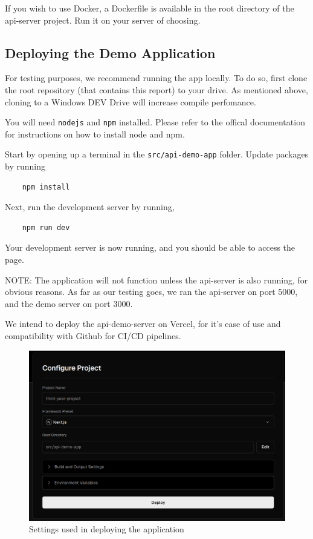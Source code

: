 If you wish to use Docker, a Dockerfile is available in the root directory of the api-server project. Run it on your server of choosing.

\subsection{Deploying the Demo Application}

For testing purposes, we recommend running the app locally. To do so, first clone the root repository (that contains this report) to your drive. As mentioned above, cloning to a Windows DEV Drive will increase compile perfomance.

You will need \texttt{nodejs} and \texttt{npm} installed. Please refer to the offical documentation for instructions on how to install node and npm.

Start by opening up a terminal in the \texttt{src/api-demo-app} folder. Update packages by running
\begin{verbatim}
    npm install
\end{verbatim}

Next, run the development server by running,
\begin{verbatim}
    npm run dev
\end{verbatim}

Your development server is now running, and you should be able to access the page.

NOTE: The application will not function unless the api-server is also running, for obvious reasons. As far as our testing goes, we ran the api-server on port 5000, and the demo server on port 3000.

We intend to deploy the api-demo-server on Vercel, for it's ease of use and compatibility with Github for CI/CD pipelines.

\begin{figure}[htbp]
    \centering
    \includegraphics[width=1\textwidth]{../../assets/vercel_deployment.png}
    \caption{Settings used in deploying the application}
    \label{fig:configuration}
\end{figure}

